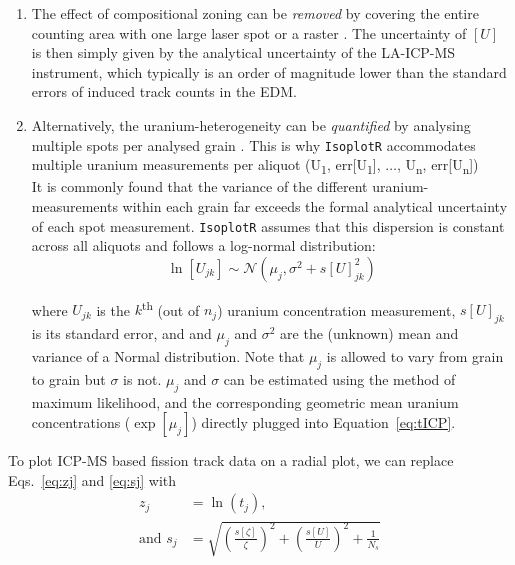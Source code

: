\begin{refsection}
\begin{enumerate}
\item The effect of compositional zoning can be \emph{removed} by
  covering the entire counting area with one large laser spot
  \citep{soares2014} or a raster \citep{hasebe2004}. The uncertainty
  of $[{U}]$ is then simply given by the analytical uncertainty of the
  LA-ICP-MS instrument, which typically is an order of magnitude lower
  than the standard errors of induced track counts in the EDM.
\item Alternatively, the uranium-heterogeneity can be
  \emph{quantified} by analysing multiple spots per analysed grain
  \citep{hasebe2009}. This is why \texttt{IsoplotR} accommodates
  multiple uranium measurements per aliquot (U\textsubscript{1},
  err[U\textsubscript{1}], $\ldots$, U\textsubscript{n},
  err[U\textsubscript{n}])\\

  It is commonly found that the variance of the different
  uranium-measurements within each grain far exceeds the formal
  analytical uncertainty of each spot measurement. \texttt{IsoplotR}
  assumes that this dispersion is constant across all aliquots and
  follows a log-normal distribution:
  \begin{equation}
    \ln[U_{jk}] \sim \mathcal{N}(\mu_j,\sigma^2+s[U]_{jk}^2)
    \label{eq:lognorm}
  \end{equation}

  where ${U}_{jk}$ is the $k$\textsuperscript{th} (out of $n_j$)
  uranium concentration measurement, $s[U]_{jk}$ is its standard
  error, and and $\mu_j$ and $\sigma^2$ are the (unknown) mean and
  variance of a Normal distribution. Note that $\mu_j$ is allowed to
  vary from grain to grain but $\sigma$ is not.  $\mu_j$ and $\sigma$
  can be estimated using the method of maximum likelihood, and the
  corresponding geometric mean uranium concentrations ($\exp[\mu_j]$)
  directly plugged into Equation~\ref{eq:tICP}.
\end{enumerate}

To plot ICP-MS based fission track data on a radial plot, we can
replace Eqs.~\ref{eq:zj} and \ref{eq:sj} with
\begin{align}
  z_j & = \ln ({t}_j) \mbox{,}   \label{eq:zj2} \\
  \mbox{and~} s_j & = \sqrt{ 
    \left(\frac{s[{\zeta}]}{{\zeta}}\right)^2 +
    \left(\frac{s[{U}]}{{U}}\right)^2 +
    \frac{1}{N_s}
  }   \label{eq:sj2}
\end{align}


\end{refsection}

